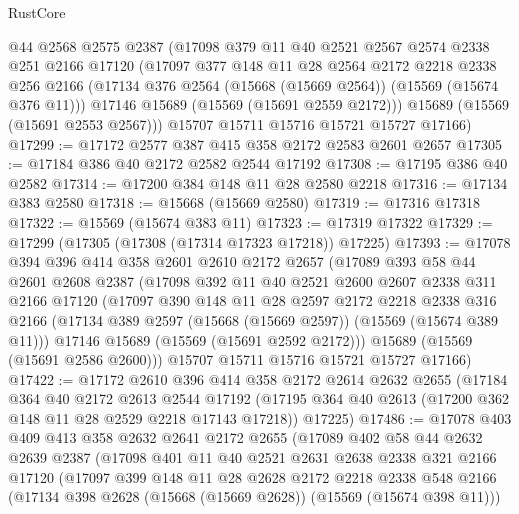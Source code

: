 \begin{lexlean}{RustCore}
\begin{coremodule}
      @44
      @2568
      @2575
      @2387
      (@17098
        @379
        @11
        @40
        @2521
        @2567
        @2574
        @2338
        @251
        @2166
        @17120
        (@17097
          @377
          @148
          @11
          @28
          @2564
          @2172
          @2218
          @2338
          @256
          @2166
          (@17134 @376 @2564 (@15668 (@15669 @2564)) (@15569 (@15674 @376 @11)))
          @17146
          @15689
          (@15569 (@15691 @2559 @2172)))
        @15689
        (@15569 (@15691 @2553 @2567)))
      @15707
      @15711
      @15716
      @15721
      @15727
      @17166)
@17299 := @17172 @2577 @387 @415 @358 @2172 @2583 @2601 @2657
@17305 := @17184 @386 @40 @2172 @2582 @2544 @17192
@17308 := @17195 @386 @40 @2582
@17314 := @17200 @384 @148 @11 @28 @2580 @2218
@17316 := @17134 @383 @2580
@17318 := @15668 (@15669 @2580)
@17319 := @17316 @17318
@17322 := @15569 (@15674 @383 @11)
@17323 := @17319 @17322
@17329 := @17299 (@17305 (@17308 (@17314 @17323 @17218)) @17225)
@17393 := @17078
    @394
    @396
    @414
    @358
    @2601
    @2610
    @2172
    @2657
    (@17089
      @393
      @58
      @44
      @2601
      @2608
      @2387
      (@17098
        @392
        @11
        @40
        @2521
        @2600
        @2607
        @2338
        @311
        @2166
        @17120
        (@17097
          @390
          @148
          @11
          @28
          @2597
          @2172
          @2218
          @2338
          @316
          @2166
          (@17134 @389 @2597 (@15668 (@15669 @2597)) (@15569 (@15674 @389 @11)))
          @17146
          @15689
          (@15569 (@15691 @2592 @2172)))
        @15689
        (@15569 (@15691 @2586 @2600)))
      @15707
      @15711
      @15716
      @15721
      @15727
      @17166)
@17422 := @17172
    @2610
    @396
    @414
    @358
    @2172
    @2614
    @2632
    @2655
    (@17184
      @364
      @40
      @2172
      @2613
      @2544
      @17192
      (@17195 @364 @40 @2613 (@17200 @362 @148 @11 @28 @2529 @2218 @17143 @17218))
      @17225)
@17486 := @17078
    @403
    @409
    @413
    @358
    @2632
    @2641
    @2172
    @2655
    (@17089
      @402
      @58
      @44
      @2632
      @2639
      @2387
      (@17098
        @401
        @11
        @40
        @2521
        @2631
        @2638
        @2338
        @321
        @2166
        @17120
        (@17097
          @399
          @148
          @11
          @28
          @2628
          @2172
          @2218
          @2338
          @548
          @2166
          (@17134 @398 @2628 (@15668 (@15669 @2628)) (@15569 (@15674 @398 @11)))

\end{coremodule}
\end{lexlean}
